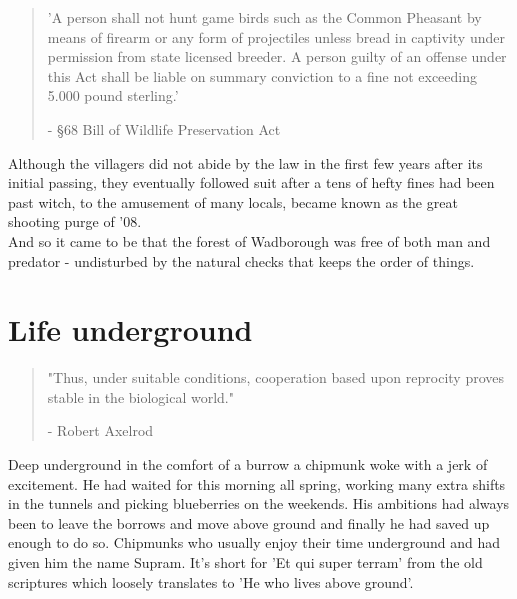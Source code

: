 \documentclass[smalldemyvopaper,11pt,twoside,onecolumn,openright,extrafontsizes]{memoir}
\begin{document}
\begin{localsize}{10}
\begin{quote}
'A person shall not hunt game birds such as the Common Pheasant by means of firearm or any form of projectiles unless bread in captivity under permission from state licensed breeder. A person guilty of an offense under this Act shall be liable on summary conviction to a fine not exceeding 5.000 pound sterling.'
\begin{flushright}- §68 Bill of Wildlife Preservation Act\end{flushright}
\end{quote} 
\end{localsize}

Although the villagers did not abide by the law in the first few years after its initial passing, they eventually followed suit after a tens of hefty fines had been past witch, to the amusement of many locals, became known as the great shooting purge of '08.\\

And so it came to be that the forest of Wadborough was free of both man and predator - undisturbed by the natural checks that keeps the order of things.

\chapter{Life underground}

\vspace{-1.3cm}
\begin{localsize}{10}
	\begin{quote}
		"Thus, under suitable conditions, cooperation based upon reprocity proves stable in the biological world."
		\begin{flushright}- Robert Axelrod \end{flushright}
	\end{quote}
\end{localsize}
\vspace{1cm}

Deep underground in the comfort of a burrow	a chipmunk woke with a jerk of excitement. He had waited for this morning all spring, working many extra shifts in the tunnels and picking blueberries on the weekends. His ambitions had always been to leave the borrows and move above ground and finally he had saved up enough to do so. Chipmunks who usually enjoy their time underground and had given him the name Supram. It's short for 'Et qui super terram' from the old scriptures which loosely translates to 'He who lives above ground'.\\
\end{document}
